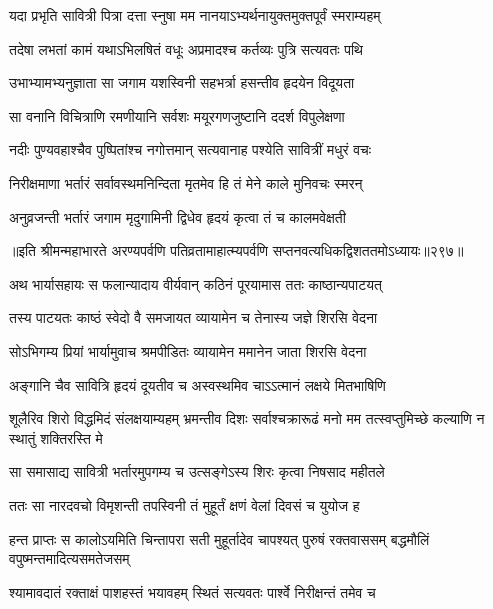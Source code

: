 \begin{center}

\twolineshloka
{यदा प्रभृति सावित्री पित्रा दत्ता स्नुषा मम}
{नानयाऽभ्यर्थनायुक्तमुक्तपूर्वं स्मराम्यहम्}

\twolineshloka
{तदेषा लभतां कामं यथाऽभिलषितं वधूः}
{अप्रमादश्च कर्तव्यः पुत्रि सत्यवतः पथि}


\twolineshloka
{उभाभ्यामभ्यनुज्ञाता सा जगाम यशस्विनी}
{सहभर्त्रा हसन्तीव हृदयेन विदूयता}

\twolineshloka
{सा वनानि विचित्राणि रमणीयानि सर्वशः}
{मयूरगणजुष्टानि ददर्श विपुलेक्षणा}

\twolineshloka
{नदीः पुण्यवहाश्चैव पुष्पितांश्च नगोत्तमान्}
{सत्यवानाह पश्येति सावित्रीं मधुरं वचः}

\twolineshloka
{निरीक्षमाणा भर्तारं सर्वावस्थमनिन्दिता}
{मृतमेव हि तं मेने काले मुनिवचः स्मरन्}

\twolineshloka
{अनुव्रजन्ती भर्तारं जगाम मृदुगामिनी}
{द्विधेव हृदयं कृत्वा तं च कालमवेक्षती}

॥इति श्रीमन्महाभारते अरण्यपर्वणि पतिव्रतामाहात्म्यपर्वणि सप्तनवत्यधिकद्विशततमोऽध्यायः॥२९७॥

\resetShloka


\twolineshloka
{अथ भार्यासहायः स फलान्यादाय वीर्यवान्}
{कठिनं पूरयामास ततः काष्ठान्यपाटयत्}

\twolineshloka
{तस्य पाटयतः काष्ठं स्वेदो वै समजायत}
{व्यायामेन च तेनास्य जज्ञे शिरसि वेदना}

\twolineshloka
{सोऽभिगम्य प्रियां भार्यामुवाच श्रमपीडितः}
{व्यायामेन ममानेन जाता शिरसि वेदना}

\twolineshloka
{अङ्गानि चैव सावित्रि हृदयं दूयतीव च}
{अस्वस्थमिव चाऽऽत्मानं लक्षये मितभाषिणि}

\threelineshloka
{शूलैरिव शिरो विद्धमिदं संलक्षयाम्यहम्}
{भ्रमन्तीव दिशः सर्वाश्चक्रारूढं मनो मम}
{तत्स्वप्तुमिच्छे कल्याणि न स्थातुं शक्तिरस्ति मे}

\twolineshloka
{सा समासाद्य सावित्री भर्तारमुपगम्य च}
{उत्सङ्गेऽस्य शिरः कृत्वा निषसाद महीतले}

\twolineshloka
{ततः सा नारदवचो विमृशन्ती तपस्विनी}
{तं मुहूर्तं क्षणं वेलां दिवसं च युयोज ह}

\threelineshloka
{हन्त प्राप्तः स कालोऽयमिति चिन्तापरा सती}
{मुहूर्तादेव चापश्यत् पुरुषं रक्तवाससम्}
{बद्धमौलिं वपुष्मन्तमादित्यसमतेजसम्}

\twolineshloka
{श्यामावदातं रक्ताक्षं पाशहस्तं भयावहम्}
{स्थितं सत्यवतः पार्श्वे निरीक्षन्तं तमेव च}


\end{center}
